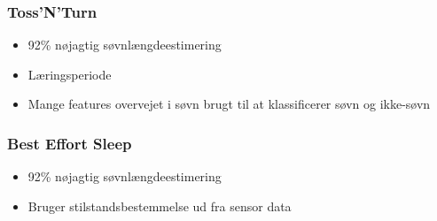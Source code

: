 \begin{frame}
\frametitle{Toss'N'Turn}
\begin{itemize}
	\item 92\% nøjagtig søvnlængdeestimering
	\item Læringsperiode
	\item Mange features overvejet i søvn brugt til at klassificerer søvn og ikke-søvn
\end{itemize}
\end{frame}

\begin{frame}
	\frametitle{Best Effort Sleep}
	\begin{itemize}
		\item 92\% nøjagtig søvnlængdeestimering
		\item Bruger stilstandsbestemmelse ud fra sensor data
	\end{itemize}
\end{frame}

